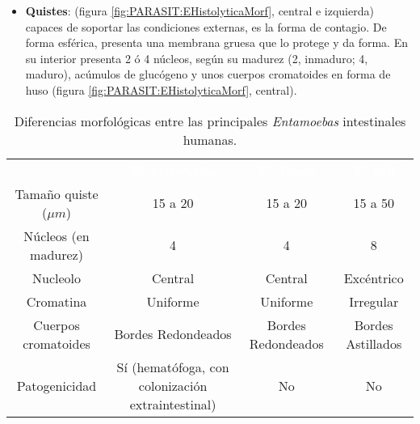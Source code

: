 \documentclass[10pt,a4paper,onecolumn,openany]{book}
\begin{document}
\begin{itemize}[itemsep=0pt,parsep=0pt,topsep=0pt,partopsep=0pt]
	\item\textbf{Quistes}: (figura \ref{fig:PARASIT:EHistolyticaMorf}, central e izquierda) capaces de soportar las condiciones externas, es la forma de contagio. De forma esférica, presenta una membrana gruesa que lo protege y da forma. En su interior presenta 2 ó 4 núcleos, según su madurez (2, inmaduro; 4, maduro), acúmulos de glucógeno y unos cuerpos cromatoides en forma de huso (figura \ref{fig:PARASIT:EHistolyticaMorf}, central).
\end{itemize}
\begin{table}[H]
	\begin{tabular}{c|ccc}
		\rowcolor{black}&\textcolor{white}{\textit{\textbf{E. histolytica}}}&\textcolor{white}{\textbf{\textit{E. dispar}}}&\textcolor{white}{\textit{\textbf{E. coli}}}\\
		Tamaño quiste ($\mu m$)&15 a 20&15 a 20&15 a 50\\
		\rowcolor{hiperlightgray}Núcleos (en madurez)&4&4&8\\
		Nucleolo&Central&Central&Excéntrico\\
		\rowcolor{hiperlightgray}Cromatina&Uniforme&Uniforme&Irregular\\
		Cuerpos cromatoides& Bordes Redondeados&Bordes Redondeados&Bordes Astillados\\
		\rowcolor{hiperlightgray}Patogenicidad&Sí (hematófoga, con colonización extraintestinal)&No&No\\
		\hline
	\end{tabular}
	\caption{Diferencias morfológicas entre las principales \textit{Entamoebas} intestinales humanas.\label{table:PARASIT:EHistolyticaDiferMorf}}
\end{table}
\newpage
\end{document}
